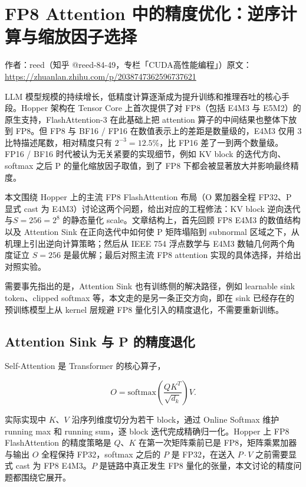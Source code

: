\chapter{FP8 Attention 中的精度优化：逆序计算与缩放因子选择}

\begin{center}\small 作者：reed（知乎 @reed-84-49，专栏「CUDA高性能编程」）\quad 原文：\url{https://zhuanlan.zhihu.com/p/2038747362596737621}\end{center}

LLM 模型规模的持续增长，低精度计算逐渐成为提升训练和推理吞吐的核心手段。Hopper 架构在 Tensor Core 上首次提供了对 FP8（包括 E4M3 与 E5M2）的原生支持，FlashAttention-3 在此基础上把 attention 算子的中间结果也整体下放到 FP8。但 FP8 与 BF16 / FP16 在数值表示上的差距是数量级的，E4M3 仅用 3 比特描述尾数，相对精度只有 $2^{-3} = 12.5\%$，比 FP16 差了一到两个数量级。FP16 / BF16 时代被认为无关紧要的实现细节，例如 KV block 的迭代方向、softmax 之后 P 的量化缩放因子取值，到了 FP8 下都会被显著放大并影响最终精度。

本文围绕 Hopper 上的主流 FP8 FlashAttention 布局（O 累加器全程 FP32、P 显式 cast 为 E4M3）讨论这两个问题，给出对应的工程修法：KV block 逆向迭代与$S = 256 = 2^8$ 的静态量化 scale。文章结构上，首先回顾 FP8 E4M3 的数值结构以及 Attention Sink 在正向迭代中如何使 P 矩阵塌陷到 subnormal 区域之下，从机理上引出逆向计算策略；然后从 IEEE 754 浮点数学与 E4M3 数轴几何两个角度证立 $S = 256$ 是最优解；最后对照主流 FP8 attention 实现的具体选择，并给出对照实验。

需要事先指出的是，Attention Sink 也有训练侧的解决路径，例如 learnable sink token、clipped softmax 等，本文走的是另一条正交方向，即在 sink 已经存在的预训练模型上从 kernel 层规避 FP8 量化引入的精度退化，不需要重新训练。

\section{Attention Sink 与 P 的精度退化}

Self-Attention 是 Transformer 的核心算子，

\begin{equation*}
O = \mathrm{softmax}\!\left(\frac{QK^T}{\sqrt{d_k}}\right)V.
\end{equation*}

实际实现中 $K$、$V$ 沿序列维度切分为若干 block，通过 Online Softmax 维护 running max 和 running sum，逐 block 迭代完成精确归一化。Hopper 上 FP8 FlashAttention 的精度策略是 $Q$、$K$ 在第一次矩阵乘前已是 FP8，矩阵乘累加器与输出 $O$ 全程保持 FP32，softmax 之后的 $P$ 是 FP32，在送入 $P \cdot V$ 之前需要显式 cast 为 FP8 E4M3。$P$ 是链路中真正发生 FP8 量化的张量，本文讨论的精度问题都围绕它展开。

